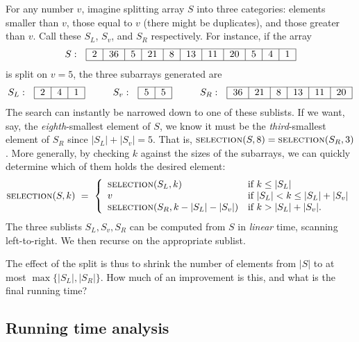\documentclass{report}
\theoremstyle{plain}
\theoremstyle{definition}
\begin{document}
For any number $v$, imagine splitting array $S$ into three categories: 
elements smaller than $v$, those equal to $v$ (there might be duplicates), 
and those greater than $v$. Call these $S_L$, $S_v$, and $S_R$ respectively. 
For instance, if the array
$$ S :\ \ \begin{tabular}{|c|c|c|c|c|c|c|c|c|c|c|} \hline
2 & 36 & 5 & 21 & 8 & 13 & 11 & 20 & 5 & 4 & 1\\ \hline
\end{tabular}$$
is split on $v = 5$, the three subarrays generated are
$$ 
S_L :\ \  \begin{tabular}{|c|c|c|} \hline 2 & 4 & 1 \\ \hline \end{tabular} 
\hskip.4in 
S_{v} :\ \ \begin{tabular}{|c|c|} \hline 5 & 5 \\ \hline \end{tabular} 
\hskip.4in 
S_{R} :\ \ \begin{tabular}{|c|c|c|c|c|c|} \hline 36 & 21 & 8 & 13 & 11 & 20 \\ \hline
\end{tabular} 
$$
The search can instantly be narrowed down to one of these sublists. If we want, say, 
the {\it eighth}-smallest element of $S$, we know it must be the {\it third}-smallest 
element of $S_R$ since $|S_L| + |S_v| = 5$.
That is, $\mbox{\sc selection}(S, 8) = \mbox{\sc selection}(S_R,3)$.
More generally, by checking $k$ against the sizes of the subarrays, 
we can quickly determine which of them holds the desired element:
$$ 
\mbox{\sc selection}(S,k) 
\ = \ 
\left\{ \begin{array}{ll}
\mbox{\sc selection}(S_{L},k) & \mbox{if $k \leq |S_{L}|$} \\ 
v                             & \mbox{if $|S_{L}| < k \leq |S_{L}| + |S_{v}|$} \\
\mbox{\sc selection}(S_{R}, k - |S_{L}| - |S_{v}|) & \mbox{if $k > |S_{L}| + |S_{v}|$} .
\end{array} \right.
$$
The three sublists $S_{L}, S_{v}, S_{R}$ can be computed from $S$ in {\it linear} 
time, scanning left-to-right. We then recurse on the appropriate sublist. 

The effect of the split is thus to shrink the number of elements from $|S|$ to 
at most $\max\{|S_{L}|, |S_{R}|\}$. How much of an improvement is this, and 
what is the final running time?

\subsection{Running time analysis}
\end{document}
